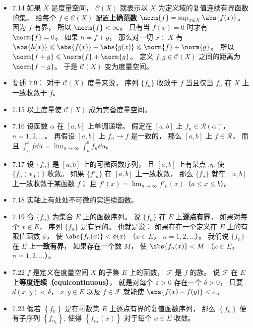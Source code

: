 \begin{itemize}
\item 7.14 如果 $X$ 是度量空间， $\mathscr C(X)$ 就表示以 $X$ 为定义域的复值连续有界函数的集。 给每个 $f\in\mathscr C(X)$ 配置\textbf{上确范数} $\norm{f} = \sup_{x\in X} \abs{f(x)}$。 因为 $f$ 有界， 所以 $\norm{f}<\infty$。 只有当 $f(x)=0$ 时才有 $\norm{f}=0$。 如果 $h=f+g$， 那么对一切 $x\in X$ 有 $\abs{h(x)}\leqslant \abs{f(x)} + \abs{g(x)}\leqslant \norm{f}+\norm{g}$。 所以 $\norm{f+g}\leqslant \norm{f}+\norm{g}$。 定义 $f,g\in\mathscr C(X)$ 之间的距离为 $\norm{f-g}$。 于是 $\mathscr C(X)$ 变为度量空间。

\item 复述 7.9： 对于 $\mathscr C(X)$ 度量来说， 序列 $\{f_n\}$ 收敛于 $f$ 当且仅当 $f_n$ 在 $X$ 上一致收敛于 $f$。

\item 7.15 以上度量使 $\mathscr C(X)$ 成为完备度量空间。

\item 7.16 设函数 $\alpha$ 在 $[a,b]$ 上单调递增。 假定在 $[a,b]$ 上 $f_n\in\mathscr R(\alpha)$， $n=1,2,\dots$。 再假设 $[a,b]$ 上 $f_n\to f$ 是一致的， 那么 $[a,b]$ 上 $f\in\mathscr R$， 而且 $\int_a^b f\dd{\alpha} = \lim_{n\to\infty}\int_a^b f_n\dd{\alpha}$。

\item 7.17 设 $\{f_n\}$ 是 $[a,b]$ 上的可微函数序列， 且 $[a,b]$ 上有某点 $x_0$ 使 $\{f_n(x_0)\}$ 收敛。 如果 $\{f'_n\}$ 在 $[a,b]$ 上一致收敛， 那么 $\{f_n\}$ 就在 $[a,b]$ 上一致收敛于某函数 $f$； 且 $f'(x) = \lim_{n\to\infty} f'_n(x)$（$a\leqslant x \leqslant b$）。

\item 7.18 实轴上有处处不可微的实连续函数。

\item 7.19 令 $\{f_n\}$ 为集合 $E$ 上的函数序列。 说 $\{f_n\}$ 在 $E$ 上\textbf{逐点有界}， 如果对每个 $x\in E$， 序列 $\{f_n\}$ 是有界的。 也就是说： 如果存在一个定义在 $E$ 上的有限值函数 $\phi$， 使 $\abs{f_n(x)}<\phi(x)$ （$x\in E$， $n=1,2,\dots$）。 我们说 $\{f_n\}$ 在 $E$ 上\textbf{一致有界}， 如果存在一个数 $M$， 使 $\abs{f_n(x)}<M$ （$x\in E$， $n=1,2,\dots$）。

\item 7.22 $f$ 是定义在度量空间 $X$ 的子集 $E$ 上的函数， $\mathscr F$ 是 $f$ 的族。 说 $\mathscr F$ 在 $E$ 上\textbf{等度连续（equicontinuous）}， 就是对每个 $\varepsilon>0$ 存在一个 $\delta >0$， 只要 $d(x,y)<\delta$， $x,y\in E$ 以及 $f\in \mathscr F$ 就能使 $\abs{f(x)-f(y)}<\varepsilon$。

\item 7.23 假若 $\left\{f_{n}\right\}$ 是在可数集 $E$ 上逐点有界的复值函数序列， 那么 $\left\{f_{n}\right\}$ 便有子序列 $\left\{f_{n_{k}}\right\}$, 使得 $\left\{f_{n_{k}}(x)\right\}$ 对于每个 $x \in E$ 收敛。


\end{itemize}
